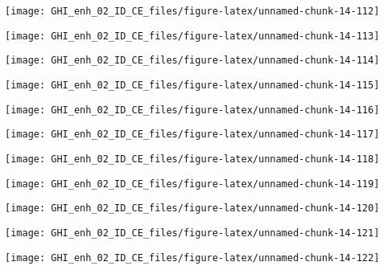 \documentclass[
  10pt,
  a4paper,oneside]{article}
\begin{document}
\begin{center}\texttt{[image: GHI\_enh\_02\_ID\_CE\_files/figure-latex/unnamed-chunk-14-112]} \end{center}

\begin{center}\texttt{[image: GHI\_enh\_02\_ID\_CE\_files/figure-latex/unnamed-chunk-14-113]} \end{center}

\begin{center}\texttt{[image: GHI\_enh\_02\_ID\_CE\_files/figure-latex/unnamed-chunk-14-114]} \end{center}

\begin{center}\texttt{[image: GHI\_enh\_02\_ID\_CE\_files/figure-latex/unnamed-chunk-14-115]} \end{center}

\begin{center}\texttt{[image: GHI\_enh\_02\_ID\_CE\_files/figure-latex/unnamed-chunk-14-116]} \end{center}

\begin{center}\texttt{[image: GHI\_enh\_02\_ID\_CE\_files/figure-latex/unnamed-chunk-14-117]} \end{center}

\begin{center}\texttt{[image: GHI\_enh\_02\_ID\_CE\_files/figure-latex/unnamed-chunk-14-118]} \end{center}

\begin{center}\texttt{[image: GHI\_enh\_02\_ID\_CE\_files/figure-latex/unnamed-chunk-14-119]} \end{center}

\begin{center}\texttt{[image: GHI\_enh\_02\_ID\_CE\_files/figure-latex/unnamed-chunk-14-120]} \end{center}

\begin{center}\texttt{[image: GHI\_enh\_02\_ID\_CE\_files/figure-latex/unnamed-chunk-14-121]} \end{center}

\begin{center}\texttt{[image: GHI\_enh\_02\_ID\_CE\_files/figure-latex/unnamed-chunk-14-122]} \end{center}
\end{document}
